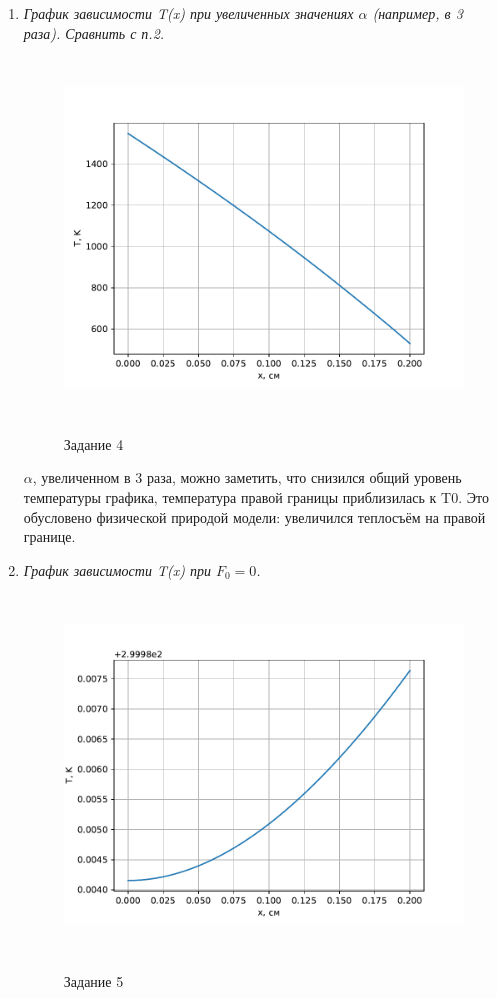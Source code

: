 \begin{enumerate}
	\newpage
	\item \textit{График зависимости T(x) при увеличенных значениях $\alpha$ (например, в 3 раза). Сравнить с п.2.}
	
	\begin{figure}[h]
		\begin{center}
			{\includegraphics[height=9.5cm, width = 18cm]{../pictures/Figure_3}}
			\caption{Задание 4}
		\end{center}
	\end{figure}

	 $\alpha$, увеличенном в 3 раза, можно заметить, что снизился общий уровень температуры графика, температура правой границы приблизилась к T0. Это обусловено физической природой модели: увеличился теплосъём на правой границе.\\
	
	\newpage
	\item \textit{График зависимости T(x) при $F_0 = 0$.}
	
	\begin{figure}[h]
		\begin{center}
			{\includegraphics[height=9.5cm, width = 18cm]{../pictures/Figure_4}}
			\caption{Задание 5}
		\end{center}
	\end{figure}
	

\end{enumerate}

